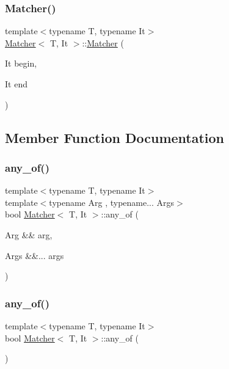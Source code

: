 \subsubsection{\texorpdfstring{Matcher()}{Matcher()}}
{\footnotesize\ttfamily template$<$typename T, typename It$>$ \\
\hyperlink{class_matcher}{Matcher}$<$ T, It $>$\+::\hyperlink{class_matcher}{Matcher} (\begin{DoxyParamCaption}\item[{It}]{begin,  }\item[{It}]{end }\end{DoxyParamCaption})\hspace{0.3cm}{\ttfamily [inline]}}



\subsection{Member Function Documentation}
\mbox{\label{class_matcher_a1db8b27d158ba0010bf7c69559773112}} 
\subsubsection{\texorpdfstring{any\+\_\+of()}{any\_of()}\hspace{0.1cm}{\footnotesize\ttfamily [1/2]}}
{\footnotesize\ttfamily template$<$typename T, typename It$>$ \\
template$<$typename Arg , typename... Args$>$ \\
bool \hyperlink{class_matcher}{Matcher}$<$ T, It $>$\+::any\+\_\+of (\begin{DoxyParamCaption}\item[{Arg \&\&}]{arg,  }\item[{Args \&\&...}]{args }\end{DoxyParamCaption})\hspace{0.3cm}{\ttfamily [inline]}}

\mbox{\label{class_matcher_a6cfab4944429c85a33d872691e0976c8}} 
\subsubsection{\texorpdfstring{any\+\_\+of()}{any\_of()}\hspace{0.1cm}{\footnotesize\ttfamily [2/2]}}
{\footnotesize\ttfamily template$<$typename T, typename It$>$ \\
bool \hyperlink{class_matcher}{Matcher}$<$ T, It $>$\+::any\+\_\+of (\begin{DoxyParamCaption}{ }\end{DoxyParamCaption})\hspace{0.3cm}{\ttfamily [inline]}}

